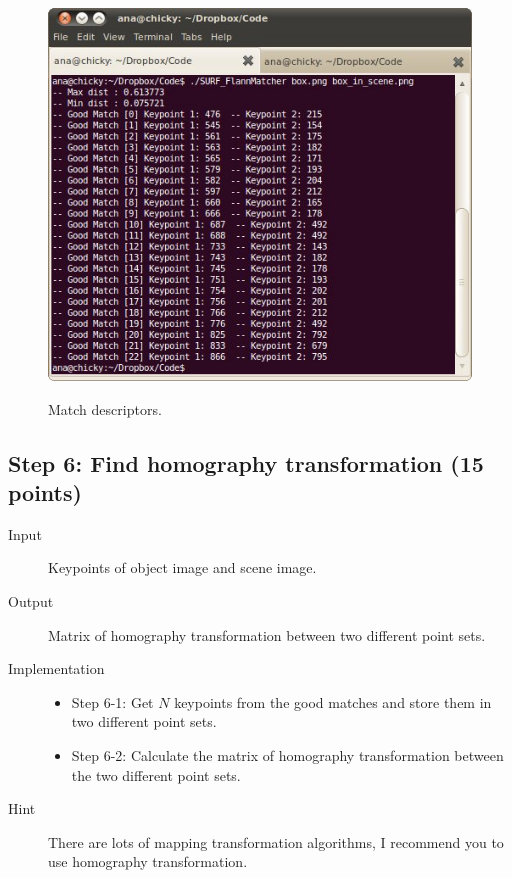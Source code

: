 \documentclass[12pt]{article}
\begin{document}
\begin{description}
\begin{figure}[!ht]
{    \includegraphics[height=0.3\textheight]{Feature_FlannMatcher_Keypoints_Result.jpg}} 
  \caption{Match descriptors.}
  \label{fig: Match descriptors} %
\end{figure}
\end{description}

\subsection{Step 6: Find homography transformation (15 points)}

\begin{description}
\item[Input] Keypoints of object image and scene image.
\item[Output] Matrix of homography transformation between two different point sets.
\item[Implementation]
\begin{itemize}
\item Step 6-1: Get $N$ keypoints from the good matches and store them in two different point sets.
\item Step 6-2: Calculate the matrix of homography transformation between the two different point sets.
\end{itemize} 
\item[Hint] There are lots of mapping transformation algorithms, I recommend you to use homography transformation.
\end{description}
\end{document}
